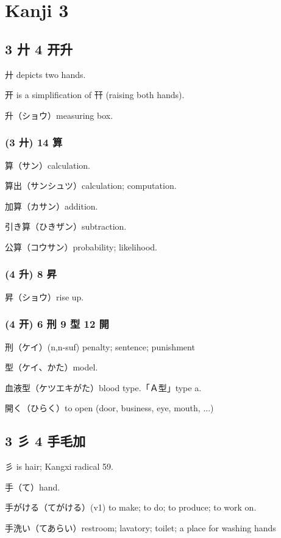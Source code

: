 \chapter{Kanji 3}

\section{3 廾 4 开升}

廾 depicts two hands.

开 is a simplification of 幵 (raising both hands).

升（ショウ）measuring box.

\subsection{(3 廾) 14 算}

算（サン）calculation.

算出（サンシュツ）calculation; computation.

加算（カサン）addition.

引き算（ひきザン）subtraction.

公算（コウサン）probability; likelihood.

\subsection{(4 升) 8 昇}

昇（ショウ）rise up.

\subsection{(4 开) 6 刑 9 型 12 開}

刑（ケイ）(n,n-suf) penalty; sentence; punishment

型（ケイ、かた）model.

血液型（ケツエキがた）blood type.「Ａ型」type a.

開く（ひらく）to open (door, business, eye, mouth, ...)

\section{3 彡 4 手毛加}

彡 is hair; Kangxi radical 59.

手（て）hand.

手がける（てがける）(v1) to make; to do; to produce; to work on.

手洗い（てあらい）restroom; lavatory; toilet; a place for washing hands

